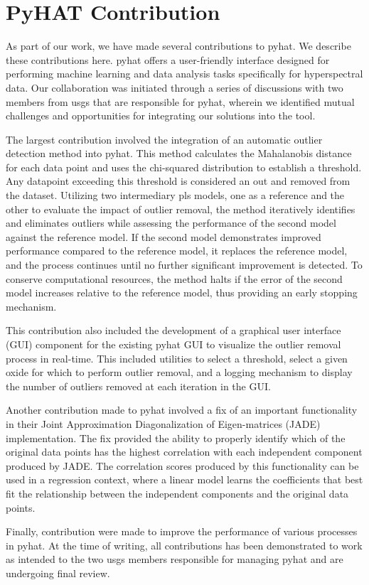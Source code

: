 \section{PyHAT Contribution}\label{sec:pyhat_contribution}
As part of our work, we have made several contributions to \gls{pyhat}. 
We describe these contributions here.
\gls{pyhat} offers a user-friendly interface designed for performing machine learning and data analysis tasks specifically for hyperspectral data.
Our collaboration was initiated through a series of discussions with two members from \gls{usgs} that are responsible for \gls{pyhat}, wherein we identified mutual challenges and opportunities for integrating our solutions into the tool.

The largest contribution involved the integration of an automatic outlier detection method into \gls{pyhat}.
This method calculates the Mahalanobis distance for each data point and uses the chi-squared distribution to establish a threshold.
Any datapoint exceeding this threshold is considered an out and removed from the dataset.
Utilizing two intermediary \gls{pls} models, one as a reference and the other to evaluate the impact of outlier removal, the method iteratively identifies and eliminates outliers while assessing the performance of the second model against the reference model. 
If the second model demonstrates improved performance compared to the reference model, it replaces the reference model, and the process continues until no further significant improvement is detected. 
To conserve computational resources, the method halts if the error of the second model increases relative to the reference model, thus providing an early stopping mechanism.

This contribution also included the development of a graphical user interface (GUI) component for the existing \gls{pyhat} GUI to visualize the outlier removal process in real-time.
This included utilities to select a threshold, select a given oxide for which to perform outlier removal, and a logging mechanism to display the number of outliers removed at each iteration in the GUI.

Another contribution made to \gls{pyhat} involved a fix of an important functionality in their Joint Approximation Diagonalization of Eigen-matrices (JADE) implementation.
The fix provided the ability to properly identify which of the original data points has the highest correlation with each independent component produced by JADE.
The correlation scores produced by this functionality can be used in a regression context, where a linear model learns the coefficients that best fit the relationship between the independent components and the original data points.

Finally, contribution were made to improve the performance of various processes in \gls{pyhat}.
At the time of writing, all contributions has been demonstrated to work as intended to the two \gls{usgs} members responsible for managing \gls{pyhat} and are undergoing final review.

 
